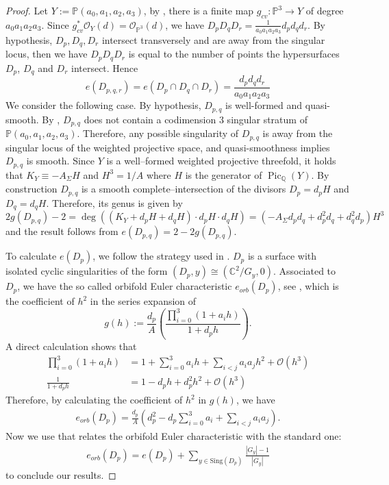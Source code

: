 \documentclass[12pt,twoside,]{amsart}
\theoremstyle{plain}
\theoremstyle{definition}
\newcommand{\Pic}{\operatorname{Pic}}
\begin{document}
\begin{proof} Let $Y:=\mathbb{P}(a_0,a_1,a_2,a_3)$, 
by \cite[Sec I.2.12]{fletcher00}, there is a finite map $g_{cv}: \mathbb{P}^3 \to Y$ of degree $a_0a_1a_2a_3$. Since $g_{cv}^*\mathcal{O}_Y(d) = \mathcal{O}_{\mathbb{P}^3}(d)$, we have $D_pD_qD_r = \displaystyle\frac{1}{a_0a_1a_2a_3}d_pd_qd_r$. By hypothesis, $D_p, D_q, D_r$ intersect transversely and are away from the singular locus, then we have $D_pD_qD_r$ is equal to the number of points the hypersurfaces $D_p$, $D_q$ and $D_r$ intersect. Hence 
    \begin{equation}\label{triple intersection}
    e(D_{p,q,r}) =  
       e(D_p \cap D_q \cap D_r) = \displaystyle\frac{d_pd_qd_r}{a_0a_1a_2a_3} 
    \end{equation}
    We consider the following case.  By hypothesis, $D_{p,q}$ is well-formed and quasi-smooth. By \cite[I.3.9]{fletcher00}, $D_{p,q}$ does not contain a codimension $3$ singular stratum of $\mathbb{P}(a_0,a_1,a_2,a_3)$. Therefore, any possible singularity of $D_{p,q}$ is away from the singular locus of the weighted projective space, and quasi-smoothness implies $D_{p,q}$ is smooth.
    Since $Y$ is a  well–formed weighted projective threefold, it holds that  $K_Y\equiv -A_\Sigma H$ and
$H^3=1/A$ where $H$ is the generator of $\Pic_{\mathbb{Q}}(Y)$. 
By construction $D_{p,q}$ is a smooth complete–intersection of the divisors $D_p = d_pH$ and $D_q =d_qH$. Therefore, its genus is given by 
\[
2g(D_{p,q})-2 = \deg\!\left((K_Y+d_pH+d_qH)\cdot d_pH\cdot d_qH\right)
=
\left(
-A_{\Sigma}d_pd_q +d_p^2d_q+d_q^2d_p
\right)H^3
\]
and the result follows from $e(D_{p,q})=2-2g(D_{p,q})$.

To calculate $e(D_p)$, we follow the strategy used in 
\cite[Section A.2]{brown2020hodge}. 
$D_p$ is a surface with isolated cyclic singularities of the form $(D_p, y) \cong \left( \mathbb{C}^2/ G_y , 0 \right)$. 
Associated to $D_p$, we have the so called 
orbifold Euler characteristic $e_{orb}(D_p)$, see  \cite{hirzebruch1990euler},  which is the coefficient of $h^2$ in the series expansion of 
\[
g(h) := \frac{d_p}{A}\left( \frac{\prod_{i=0}^3  (1+ a_ih)}{1+ d_ph}\right).
\]
A direct calculation shows that
\begin{align*}
\prod_{i=0}^3  (1+ a_ih) & = 1 + \sum_{i=0}^{3} a_i h + \sum_{i < j} a_i a_j h^2 + \mathcal{O}(h^3)
\\
\frac{1}{1+ d_ph} &= 1 - d_ph + d_p^2 h^2 + \mathcal{O}(h^3)
\end{align*}
Therefore, by calculating the coefficient of $h^2$ in $g(h)$, we have
\begin{align*}
e_{orb}(D_p) = 
\frac{d_p}{A} \left(
d_p^2
- d_p\sum_{i=0}^{3} a_i
+ \sum_{i<j} a_ia_j 
\right).
\end{align*}
Now we use \cite[Sec 2.11-2.14]{blache1996chern} that relates the orbifold Euler characteristic with the standard one:
\begin{align*}
 e_{orb}(D_p) = 
 e(D_p) 
+ \sum_{y\in \text{Sing}(D_p)} \frac{|G_y| -1}{|G_y|} 
\end{align*}
to conclude our results.
\end{proof}
\end{document}
